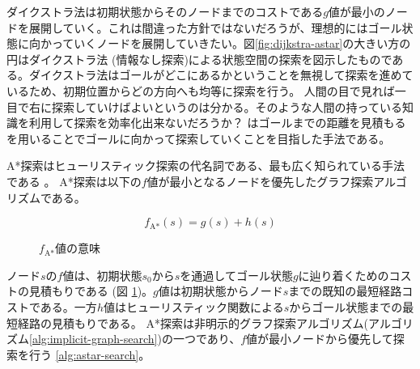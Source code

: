 ダイクストラ法は初期状態からそのノードまでのコストである$g$値が最小のノードを展開していく。これは間違った方針ではないだろうが、理想的にはゴール状態に向かっていくノードを展開していきたい。図\ref{fig:dijkstra-astar}の大きい方の円はダイクストラ法 (情報なし探索)による状態空間の探索を図示したものである。ダイクストラ法はゴールがどこにあるかということを無視して探索を進めているため、初期位置からどの方向へも均等に探索を行う。
人間の目で見れば一目で右に探索していけばよいというのは分かる。そのような人間の持っている知識を利用して探索を効率化出来ないだろうか？
はゴールまでの距離を見積もるを用いることでゴールに向かって探索していくことを目指した手法である。

A*探索はヒューリスティック探索の代名詞である、最も広く知られている手法である \cite{fikes:71}。
A*探索は以下の$f$値が最小となるノードを優先したグラフ探索アルゴリズムである。

\begin{equation}
  f_{\text{A*}}(s) = g(s) + h(s)
\label{alg:astar-search}
\end{equation}

\begin{figure}
  \centering
  \begin{tikzpicture}[scale=0.6]
    
  \end{tikzpicture}
  \caption{$f_{\text{A*}}$値の意味}
  \label{fig:fvalue}
\end{figure}


ノード$s$の$f$値は、初期状態$s_0$から$s$を通過してゴール状態$g$に辿り着くためのコストの見積もりである (図 \ref{fig:fvalue})。$g$値は初期状態からノード$s$までの既知の最短経路コストである。一方$h$値はヒューリスティック関数による$s$からゴール状態までの最短経路の見積もりである。
A*探索は非明示的グラフ探索アルゴリズム(アルゴリズム\ref{alg:implicit-graph-search})の一つであり、$f$値が最小ノードから優先して探索を行う \ref{alg:astar-search}。




